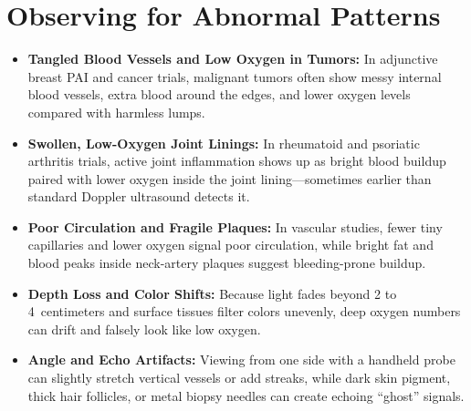 \section{Observing for Abnormal Patterns}
\begin{itemize}
  \item \textbf{Tangled Blood Vessels and Low Oxygen in Tumors:} In adjunctive breast PAI and cancer trials, malignant tumors often show messy internal blood vessels, extra blood around the edges, and lower oxygen levels compared with harmless lumps.
  \item \textbf{Swollen, Low-Oxygen Joint Linings:} In rheumatoid and psoriatic arthritis trials, active joint inflammation shows up as bright blood buildup paired with lower oxygen inside the joint lining---sometimes earlier than standard Doppler ultrasound detects it.
  \item \textbf{Poor Circulation and Fragile Plaques:} In vascular studies, fewer tiny capillaries and lower oxygen signal poor circulation, while bright fat and blood peaks inside neck-artery plaques suggest bleeding-prone buildup.
  \item \textbf{Depth Loss and Color Shifts:} Because light fades beyond 2 to 4~centimeters and surface tissues filter colors unevenly, deep oxygen numbers can drift and falsely look like low oxygen.
  \item \textbf{Angle and Echo Artifacts:} Viewing from one side with a handheld probe can slightly stretch vertical vessels or add streaks, while dark skin pigment, thick hair follicles, or metal biopsy needles can create echoing ``ghost'' signals.
\end{itemize}

